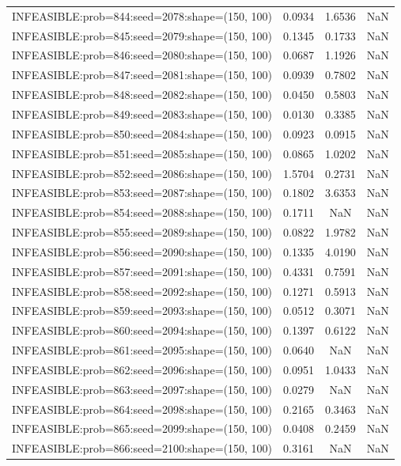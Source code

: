 \begin{longtable}{lccc}
INFEASIBLE:prob=844:seed=2078:shape=(150, 100) & 0.0934 &  1.6536 &    NaN \\
INFEASIBLE:prob=845:seed=2079:shape=(150, 100) & 0.1345 &  0.1733 &    NaN \\
INFEASIBLE:prob=846:seed=2080:shape=(150, 100) & 0.0687 &  1.1926 &    NaN \\
INFEASIBLE:prob=847:seed=2081:shape=(150, 100) & 0.0939 &  0.7802 &    NaN \\
INFEASIBLE:prob=848:seed=2082:shape=(150, 100) & 0.0450 &  0.5803 &    NaN \\
INFEASIBLE:prob=849:seed=2083:shape=(150, 100) & 0.0130 &  0.3385 &    NaN \\
INFEASIBLE:prob=850:seed=2084:shape=(150, 100) & 0.0923 &  0.0915 &    NaN \\
INFEASIBLE:prob=851:seed=2085:shape=(150, 100) & 0.0865 &  1.0202 &    NaN \\
INFEASIBLE:prob=852:seed=2086:shape=(150, 100) & 1.5704 &  0.2731 &    NaN \\
INFEASIBLE:prob=853:seed=2087:shape=(150, 100) & 0.1802 &  3.6353 &    NaN \\
INFEASIBLE:prob=854:seed=2088:shape=(150, 100) & 0.1711 &     NaN &    NaN \\
INFEASIBLE:prob=855:seed=2089:shape=(150, 100) & 0.0822 &  1.9782 &    NaN \\
INFEASIBLE:prob=856:seed=2090:shape=(150, 100) & 0.1335 &  4.0190 &    NaN \\
INFEASIBLE:prob=857:seed=2091:shape=(150, 100) & 0.4331 &  0.7591 &    NaN \\
INFEASIBLE:prob=858:seed=2092:shape=(150, 100) & 0.1271 &  0.5913 &    NaN \\
INFEASIBLE:prob=859:seed=2093:shape=(150, 100) & 0.0512 &  0.3071 &    NaN \\
INFEASIBLE:prob=860:seed=2094:shape=(150, 100) & 0.1397 &  0.6122 &    NaN \\
INFEASIBLE:prob=861:seed=2095:shape=(150, 100) & 0.0640 &     NaN &    NaN \\
INFEASIBLE:prob=862:seed=2096:shape=(150, 100) & 0.0951 &  1.0433 &    NaN \\
INFEASIBLE:prob=863:seed=2097:shape=(150, 100) & 0.0279 &     NaN &    NaN \\
INFEASIBLE:prob=864:seed=2098:shape=(150, 100) & 0.2165 &  0.3463 &    NaN \\
INFEASIBLE:prob=865:seed=2099:shape=(150, 100) & 0.0408 &  0.2459 &    NaN \\
INFEASIBLE:prob=866:seed=2100:shape=(150, 100) & 0.3161 &     NaN &    NaN \\

\end{longtable}
